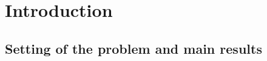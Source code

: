 \documentclass[a4paper,
11pt,  reqno]{amsart}
\newcommand{\5}{\textup{V}}
\theoremstyle{remark}
\numberwithin{equation}{section}
\numberwithin{theorem}{section}
\providecommand{\DIFaddbegin}{} %
\providecommand{\DIFaddend}{} %
\begin{document}
\DIFaddbegin \maketitle

\DIFaddend \section{Introduction}
\DIFaddbegin 

\DIFaddend \subsection{Setting of the problem and main results}
\DIFaddbegin 
\end{document}
